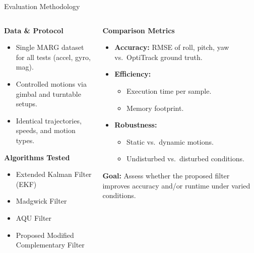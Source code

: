 \documentclass[aspectratio=169,xcolor=dvipsnames]{beamer}
\begin{document}
\begin{frame}{Evaluation Methodology}
\scriptsize
\begin{columns}[T]
  \begin{column}{0.48\textwidth}
    \textbf{Data \& Protocol}
    \begin{itemize}
      \item Single MARG dataset for all tests (accel, gyro, mag).
      \item Controlled motions via gimbal and turntable setups.
      \item Identical trajectories, speeds, and motion types.
    \end{itemize}
    \vspace{0.5em}
    \textbf{Algorithms Tested}
    \begin{itemize}
      \item Extended Kalman Filter (EKF)
      \item Madgwick Filter
      \item AQU Filter
      \item Proposed Modified Complementary Filter
    \end{itemize}
  \end{column}

  \begin{column}{0.48\textwidth}
    \textbf{Comparison Metrics}
    \begin{itemize}
      \item \textbf{Accuracy:} RMSE of roll, pitch, yaw vs.\ OptiTrack ground truth.
      \item \textbf{Efficiency:}
        \begin{itemize}
          \item Execution time per sample.
          \item Memory footprint.
        \end{itemize}
      \item \textbf{Robustness:}
        \begin{itemize}
          \item Static vs.\ dynamic motions.
          \item Undisturbed vs.\ disturbed conditions.
        \end{itemize}
    \end{itemize}
    \vspace{0.5em}
    \textbf{Goal:} Assess whether the proposed filter improves accuracy and/or runtime under varied conditions.
  \end{column}
\end{columns}
\end{frame}
\end{document}
